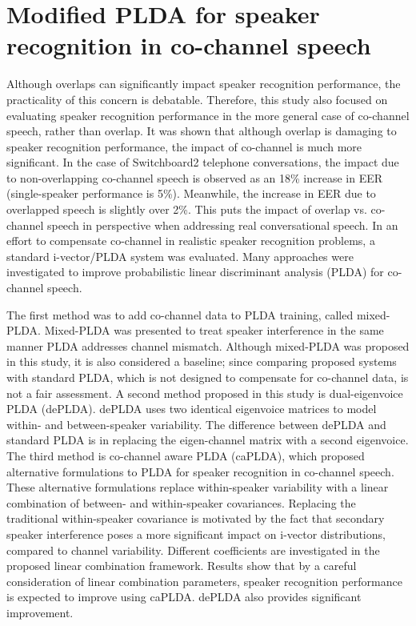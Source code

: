\section{Modified PLDA for speaker recognition in co-channel speech}
Although overlaps can significantly impact speaker recognition performance, the practicality of this concern is debatable. 
Therefore, this study also focused on evaluating speaker recognition performance in the more general case of co-channel speech, rather than overlap. 
It was shown that although overlap is damaging to speaker recognition performance, the impact of co-channel is much more significant. 
In the case of Switchboard2 telephone conversations, the impact due to non-overlapping co-channel speech is observed as an 18\% increase in EER (single-speaker performance is 5\%). 
Meanwhile, the increase in EER due to overlapped speech is slightly over 2\%. 
This puts the impact of overlap vs. co-channel speech in perspective when addressing real conversational speech. 
In an effort to compensate co-channel in realistic speaker recognition problems, a standard i-vector/PLDA system was evaluated. 
Many approaches were investigated to improve probabilistic linear discriminant analysis (PLDA) for co-channel speech. 

The first method was to add co-channel data to PLDA training, called mixed-PLDA. 
Mixed-PLDA was presented to treat speaker interference in the same manner PLDA addresses channel mismatch. 
Although mixed-PLDA was proposed in this study, it is also considered a baseline; since comparing proposed systems with standard PLDA, which is not designed to compensate for co-channel data, is not a fair assessment. 
A second method proposed in this study is dual-eigenvoice PLDA (dePLDA). dePLDA uses two identical eigenvoice matrices to model within- and between-speaker variability. 
The difference between dePLDA and standard PLDA is in replacing the eigen-channel matrix with a second eigenvoice. 
The third method is co-channel aware PLDA (caPLDA), which proposed alternative formulations to PLDA for speaker recognition in co-channel speech. 
These alternative formulations replace within-speaker variability with a linear combination of between- and within-speaker covariances. 
Replacing the traditional within-speaker covariance is motivated by the fact that secondary speaker interference poses a more significant impact on i-vector distributions, compared to channel variability. 
Different coefficients are investigated in the proposed linear combination framework. 
Results show that by a careful consideration of linear combination parameters, speaker recognition performance is expected to improve using caPLDA. 
dePLDA also provides significant improvement.  

